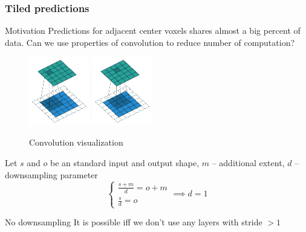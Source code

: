 \documentclass{beamer}
\begin{document}
\begin{frame}
    \frametitle{Tiled predictions}

    \begin{block}{Motivation}
        Predictions for adjacent center voxels shares almost a big percent of data. Can we use
        properties of convolution to reduce number of computation?
    \end{block}

    \begin{minipage}{0.49\textwidth}
        \begin{figure}
            \includegraphics[height=3cm]{conv1.png}
            \includegraphics[height=3cm]{conv2.png}
            \caption{Convolution visualization}
        \end{figure}
    \end{minipage}
    \begin{minipage}{0.49\textwidth}
        Let \( s \) and \( o \) be an standard input and output shape, \( m \) -- additional extent, \( d \) -- downsampling parameter
        \begin{equation*}
            \begin{cases}
                \frac{s + m}{d} = o + m \\
                \frac{s}{d} = o
            \end{cases}
            \implies d = 1
        \end{equation*}

        \begin{alertblock}{No downsampling}
            It is possible iff we don't use any layers with stride \( >1 \)
        \end{alertblock}
    \end{minipage}

\end{frame}
\end{document}
